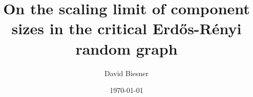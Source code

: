 



\makeindex

\title{
	{On the scaling limit of component sizes in the critical Erd\H os-Rényi random graph}\\
}
\author{David Biesner}
\date{\today}


	
	\maketitle
	
	\newpage
	
	
	
	\tableofcontents 
	\newpage
	
	\cleardoublepage
	\listoffigures
	
	\glsaddall
	\printnoidxglossary[title={List of Symbols}, sort=def]
	
	
	
	
	
	
	
	
	
	
	\nocite{Erdos.1960}
	\nocite{Kallenberg.1983}
	\nocite{Kingman.1993}
	\nocite{Luczak.1994}
	\nocite{MartinLof.1998}
	
	 
	
	
	
	
